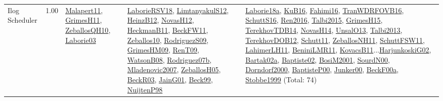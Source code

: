 {\begin{longtable}{p{3cm}r>{\raggedright\arraybackslash}p{6cm}>{\raggedright\arraybackslash}p{6cm}>{\raggedright\arraybackslash}p{8cm}}
\index{Ilog Scheduler}\index{CPSystems!Ilog Scheduler}Ilog Scheduler &  1.00 & \hyperref[detail:Malapert11]{Malapert11}, \hyperref[detail:GrimesH11]{GrimesH11}, \hyperref[detail:ZeballosQH10]{ZeballosQH10}, \hyperref[detail:Laborie03]{Laborie03} & \hyperref[detail:LaborieRSV18]{LaborieRSV18}, \hyperref[detail:LimtanyakulS12]{LimtanyakulS12}, \hyperref[detail:HeinzB12]{HeinzB12}, \hyperref[detail:NovasH12]{NovasH12}, \hyperref[detail:HeckmanB11]{HeckmanB11}, \hyperref[detail:BeckFW11]{BeckFW11}, \hyperref[detail:Zeballos10]{Zeballos10}, \hyperref[detail:RodriguezS09]{RodriguezS09}, \hyperref[detail:GrimesHM09]{GrimesHM09}, \hyperref[detail:RenT09]{RenT09}, \hyperref[detail:WatsonB08]{WatsonB08}, \hyperref[detail:Rodriguez07b]{Rodriguez07b}, \hyperref[detail:Mladenovic2007]{Mladenovic2007}, \hyperref[detail:ZeballosH05]{ZeballosH05}, \hyperref[detail:BeckR03]{BeckR03}, \hyperref[detail:JainG01]{JainG01}, \hyperref[detail:Beck99]{Beck99}, \hyperref[detail:NuijtenP98]{NuijtenP98} & \hyperref[detail:Laborie18a]{Laborie18a}, \hyperref[detail:KuB16]{KuB16}, \hyperref[detail:Fahimi16]{Fahimi16}, \hyperref[detail:TranWDRFOVB16]{TranWDRFOVB16}, \hyperref[detail:SchuttS16]{SchuttS16}, \hyperref[detail:Ren2016]{Ren2016}, \hyperref[detail:Talbi2015]{Talbi2015}, \hyperref[detail:GrimesH15]{GrimesH15}, \hyperref[detail:TerekhovTDB14]{TerekhovTDB14}, \hyperref[detail:NovasH14]{NovasH14}, \hyperref[detail:UnsalO13]{UnsalO13}, \hyperref[detail:Talbi2013]{Talbi2013}, \hyperref[detail:TerekhovDOB12]{TerekhovDOB12}, \hyperref[detail:Schutt11]{Schutt11}, \hyperref[detail:ZeballosNH11]{ZeballosNH11}, \hyperref[detail:SchuttFSW11]{SchuttFSW11}, \hyperref[detail:LahimerLH11]{LahimerLH11}, \hyperref[detail:BeniniLMR11]{BeniniLMR11}, \hyperref[detail:KovacsB11]{KovacsB11}...\hyperref[detail:HarjunkoskiG02]{HarjunkoskiG02}, \hyperref[detail:Bartak02a]{Bartak02a}, \hyperref[detail:Baptiste02]{Baptiste02}, \hyperref[detail:BosiM2001]{BosiM2001}, \hyperref[detail:SourdN00]{SourdN00}, \hyperref[detail:Dorndorf2000]{Dorndorf2000}, \hyperref[detail:BaptisteP00]{BaptisteP00}, \hyperref[detail:Junker00]{Junker00}, \hyperref[detail:BeckF00a]{BeckF00a}, \hyperref[detail:Stobbe1999]{Stobbe1999} (Total: 74)\\

\end{longtable}}
